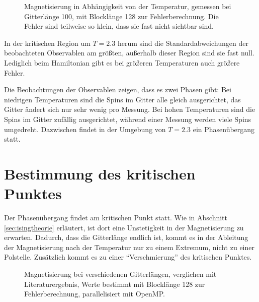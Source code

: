	
	\begin{figure}[htbp]
		
		\caption[Magnetisierung in Abhängigkeit von der Temperatur]{Magnetisierung in Abhängigkeit von der Temperatur, gemessen bei Gitterlänge 100, mit Blocklänge 128 zur Fehlerberechnung. Die Fehler sind teilweise so klein, dass sie fast nicht sichtbar sind.}
		\label{fig:ergebnismagnetisierung}
	\end{figure}
	
	In der kritischen Region um $T=\num{2,3}$ herum sind die Standardabweichungen der beobachteten Observablen am größten, außerhalb dieser Region sind sie fast null. Lediglich beim Hamiltonian gibt es bei größeren Temperaturen auch größere Fehler. 
	
	Die Beobachtungen der Observablen zeigen, dass es zwei Phasen gibt: Bei niedrigen Temperaturen sind die Spins im Gitter alle gleich ausgerichtet, das Gitter ändert sich nur sehr wenig pro Messung. Bei hohen Temperaturen sind die Spins im Gitter zufällig ausgerichtet, während einer Messung werden viele Spins umgedreht. Dazwischen findet in der Umgebung von $T=\num{2,3}$ ein Phasenübergang statt.
	
	\section{Bestimmung des kritischen Punktes}
	\label{sec:bestkritpunkt}
	
	Der Phasenübergang findet am kritischen Punkt statt. Wie in Abschnitt \ref{sec:isingtheorie} erläutert, ist dort eine Unstetigkeit in der Magnetisierung zu erwarten. Dadurch, dass die Gitterlänge endlich ist, kommt es in der Ableitung der Magnetisierung nach der Temperatur nur zu einem Extremum, nicht zu einer Polstelle. Zusätzlich kommt es zu einer \enquote{Verschmierung} des kritischen Punktes\cite[vgl. ][S. 104]{binderheermann}.
		
	\begin{figure}[htbp]
		
		\caption[Magnetisierung bei verschiedenen Gitterlängen und Verwendung von OpenMP]{Magnetisierung bei verschiedenen Gitterlängen, verglichen mit Literaturergebnis, Werte bestimmt mit Blocklänge 128 zur Fehlerberechnung, parallelisiert mit OpenMP.}
		\label{fig:maglaenge}
	\end{figure}

